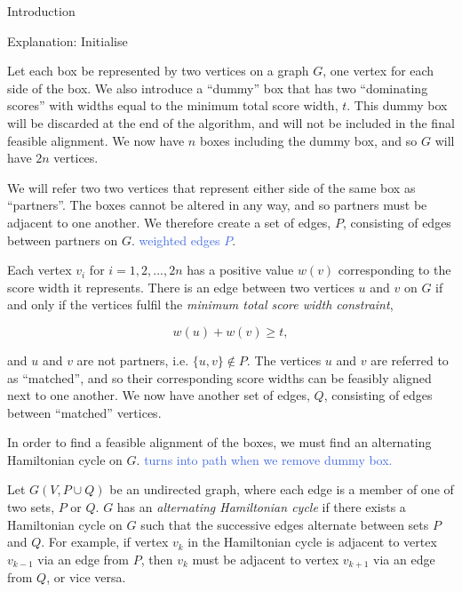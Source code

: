 \documentclass[oribibl]{llncs}
\begin{document}
Introduction

Explanation: Initialise

Let each box be represented by two vertices on a graph $G$, one vertex for each side of the box. We also introduce a ``dummy'' box that has two ``dominating scores'' with widths equal to the minimum total score width, $t$. This dummy box will be discarded at the end of the algorithm, and will not be included in the final feasible alignment. We now have $n$ boxes including the dummy box, and so $G$ will have $2n$ vertices.

We will refer two two vertices that represent either side of the same box as ``partners''. The boxes cannot be altered in any way, and so partners must be adjacent to one another. We therefore create a set of edges, $P$, consisting of edges between partners on $G$. \textcolor{RoyalBlue}{weighted edges $P$}.

Each vertex $v_i$ for $i = 1, 2, ..., 2n$ has a positive value $w(v)$ corresponding to the score width it represents. There is an edge between two vertices $u$ and $v$ on $G$ if and only if the vertices fulfil the \textit{minimum total score width constraint}, 

\begin{equation*}
	w(u) + w(v) \geq t,
\end{equation*}

and $u$ and $v$ are not partners, i.e. $\{u, v\} \notin P$. The vertices $u$ and $v$ are referred to as \textcolor{OliveGreen}{``matched''}, and so their corresponding score widths can be feasibly aligned next to one another. We now have another set of edges, $Q$, consisting of edges between \textcolor{OliveGreen}{``matched''} vertices.  

In order to find a feasible alignment of the boxes, we must find an alternating Hamiltonian cycle on $G$. \textcolor{RoyalBlue}{turns into path when we remove dummy box.}

\begin{definition}
	
	Let $G(V, P\cup Q)$ be an undirected graph, where each edge is a member of one of two sets, $P$ or $Q$. $G$ has an \textit{alternating Hamiltonian cycle} if there exists a Hamiltonian cycle on $G$ such that the successive edges alternate between sets $P$ and $Q$. For example, if vertex $v_k$ in the Hamiltonian cycle is adjacent to vertex $v_{k-1}$ via an edge from $P$, then $v_k$ must be adjacent to vertex $v_{k+1}$ via an edge from $Q$, or vice versa. 
\end{definition}
\end{document}

